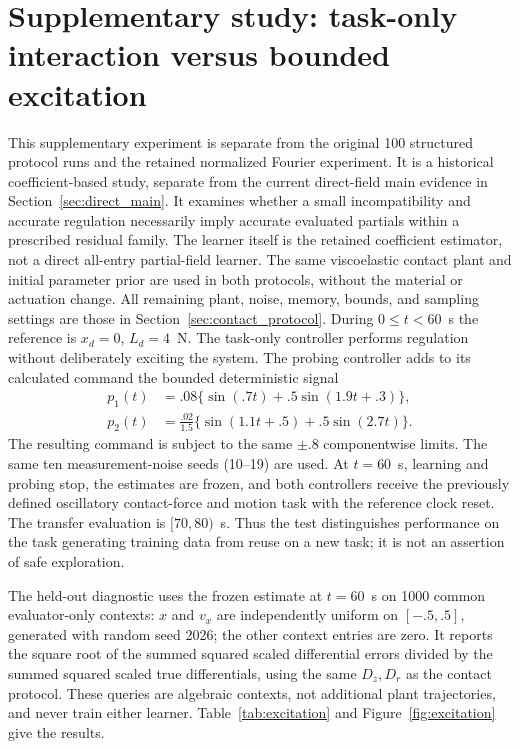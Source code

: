 \section{Supplementary study: task-only interaction versus bounded excitation}
\label{sec:excitation}
This supplementary experiment is separate from the original 100 structured
protocol runs and the retained normalized Fourier experiment. It is a
historical coefficient-based study, separate from the current direct-field
main evidence in Section~\ref{sec:direct_main}. It examines whether a small incompatibility and accurate
regulation necessarily imply accurate evaluated partials within a prescribed
residual family. The learner itself is the retained coefficient estimator,
not a direct all-entry partial-field learner.
The same viscoelastic contact plant and initial parameter prior are used in
both protocols, without the material or actuation change. All remaining plant, noise,
memory, bounds, and sampling settings are those in
Section~\ref{sec:contact_protocol}. During $0\le t<60$~s the
reference is $x_d=0$, $L_d=4$~N. The task-only controller performs regulation
without deliberately exciting the system. The probing controller adds to
its calculated command the bounded deterministic signal
\begin{align}
 p_1(t)&=.08\{\sin(.7t)+.5\sin(1.9t+.3)\},\\
 p_2(t)&=\frac{.02}{1.5}\{\sin(1.1t+.5)+.5\sin(2.7t)\}.
\end{align}
The resulting command is subject to the same $\pm.8$ componentwise limits.
The same ten measurement-noise seeds (10--19) are used. At $t=60$~s,
learning and probing stop, the estimates are frozen, and both controllers
receive the previously defined oscillatory contact-force and motion task
with the reference clock reset. The transfer evaluation is $[70,80)$~s.
Thus the test distinguishes performance on the task generating training data
from reuse on a new task; it is not an assertion of safe exploration.

The held-out diagnostic uses the frozen estimate at $t=60$~s on 1000
common evaluator-only contexts: $x$ and $v_x$ are independently uniform on
$[-.5,.5]$, generated with random seed 2026; the other context entries are
zero. It reports the square root of the summed squared scaled differential
errors divided by the summed squared scaled true differentials, using the
same $D_z,D_r$ as the contact protocol. These queries are algebraic contexts,
not additional plant trajectories, and never train either learner.
Table~\ref{tab:excitation} and Figure~\ref{fig:excitation} give the results.

